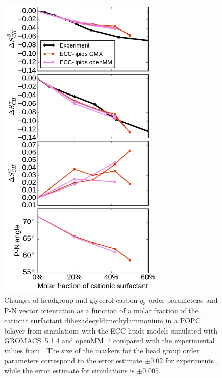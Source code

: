 \documentclass[journal=jpcbfk]{achemso}
\begin{document}
\begin{figure}[!p]
  \centering
  \includegraphics[width=8.0cm]{../Fig/ipython_nb/PN_angle_OrdPars-A-B-g3_L14-ECCL17_q80_sig89_surf_GMX-oMM_compar.pdf}
  \caption{\label{fig:ordPars_surf_GMX_oMM_compar}
    Changes of headgroup and glycerol carbon $g_3$ order parameters, and P-N vector orientation as a function of
    a molar fraction of the cationic surfactant dihexadecyldimethylammonium in a POPC bilayer
    from simulations with the ECC-lipids models
    simulated with GROMACS~5.1.4 \cite{Abraham15} and openMM~7 \cite{openmm7} 
    compared with the experimental values from \cite{scherer89}.
    The size of the markers for the head group order parameters correspond to
    the error estimate $\pm 0.02$ for experiments \cite{botan15,ollila16},
    while the error estimate for simulations is $\pm 0.005$.
  }
\end{figure}
\end{document}
